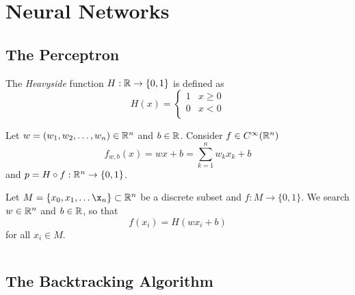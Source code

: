 
\newpage
\section{Neural Networks}

\subsection{The Perceptron}
\begin{definition}
The \emph{Heavyside} function \( H: \mathbb{R} \to \{ 0, 1 \} \) is defined as
\[
	H(x) = \left\{
		\begin{array}{ll}
			1 & x \ge 0 \\
			0 & x < 0 \\
		\end{array} 
	\right.
\]
\end{definition}
\bigskip

Let \( w = (w_1, w_2, \dots, w_n) \in \mathbb{R}^n \) and \( b \in \mathbb{R} \). Consider \( f \in C^\infty(\mathbb{R}^n) \)
\[
	f_{w, b}(x) = wx + b = \sum_{k = 1}^n w_k x_k + b
\]
and \( p = H \circ f: \mathbb{R}^n \to \{0, 1 \} \). 

Let \( M = \{ x_0, x_1, \dots \x_n \} \subset \R^n \) be a discrete subset and \( f: M \to \{ 0, 1 \} \).
We search \( w \in \mathbb{R}^n \) and \( b \in \mathbb{R} \), so that 
\[
	f(x_i) = H(wx_i + b)
\]
for all \( x_i \in M \).
\bigskip


\begin{algorithm}[Perceptron]\label{algo:perceptron}
\end{algorithm}
\inputminted[fontsize=\small, framesep=0.35cm, frame=lines, python3=true]{python}{perceptron.py}
\bigskip


\subsection{The Backtracking Algorithm}


